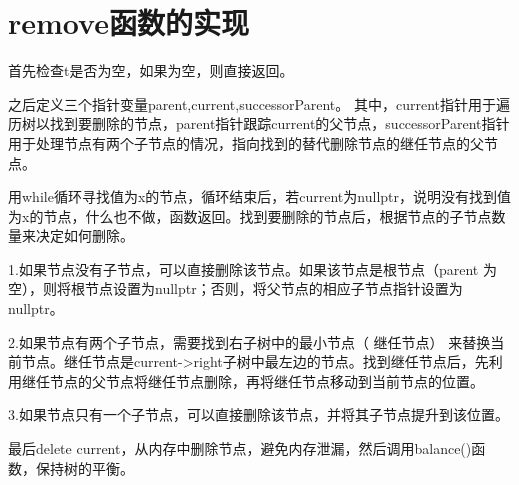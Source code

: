 \documentclass[UTF8]{ctexart}
\begin{document}
\pagestyle{fancy}
\fancyhead{}

\section*{remove函数的实现}

首先检查t是否为空，如果为空，则直接返回。

之后定义三个指针变量parent,current,successorParent。
其中，current指针用于遍历树以找到要删除的节点，parent指针跟踪current的父节点，successorParent指针用于处理节点有两个子节点的情况，指向找到的替代删除节点的继任节点的父节点。

用while循环寻找值为x的节点，循环结束后，若current为nullptr，说明没有找到值为x的节点，什么也不做，函数返回。找到要删除的节点后，根据节点的子节点数量来决定如何删除。

1.如果节点没有子节点，可以直接删除该节点。如果该节点是根节点（parent 为空），则将根节点设置为nullptr；否则，将父节点的相应子节点指针设置为nullptr。

2.如果节点有两个子节点，需要找到右子树中的最小节点（ 继任节点） 来替换当前节点。继任节点是current->right子树中最左边的节点。找到继任节点后，先利用继任节点的父节点将继任节点删除，再将继任节点移动到当前节点的位置。

3.如果节点只有一个子节点，可以直接删除该节点，并将其子节点提升到该位置。

最后delete current，从内存中删除节点，避免内存泄漏，然后调用balance()函数，保持树的平衡。
\end{document}
